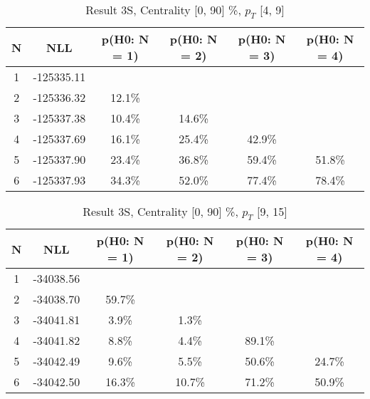 \begin{table}[htb]
	\begin{center}
	\caption{Result 3S, Centrality [0, 90] \%, $p_{T}$ [4, 9] \GeV
}
{\footnotesize\renewcommand{\arraystretch}{1.4}
		\begin{tabular}{cc||>{\columncolor[gray]{0.8}}cccc}
			N & NLL & p(H0: N = 1) & p(H0: N = 2) & p(H0: N = 3) & p(H0: N = 4)\\ 
		\hline
1 & -125335.11 & & & & \\
2 & -125336.32 & 12.1\% & & & \\
3 & -125337.38 & 10.4\% & 14.6\% & & \\
4 & -125337.69 & 16.1\% & 25.4\% & 42.9\% & \\
5 & -125337.90 & 23.4\% & 36.8\% & 59.4\% & 51.8\% \\
6 & -125337.93 & 34.3\% & 52.0\% & 77.4\% & 78.4\% \\
	\end{tabular}
		\label{tab:lab}
	}
	\end{center}\end{table}

\begin{table}[htb]
	\begin{center}
	\caption{Result 3S, Centrality [0, 90] \%, $p_{T}$ [9, 15] \GeV
}
{\footnotesize\renewcommand{\arraystretch}{1.4}
		\begin{tabular}{cc||cc>{\columncolor[gray]{0.8}}cc}
			N & NLL & p(H0: N = 1) & p(H0: N = 2) & p(H0: N = 3) & p(H0: N = 4)\\ 
		\hline
1 & -34038.56 & & & & \\
2 & -34038.70 & 59.7\% & & & \\
3 & -34041.81 & 3.9\% & 1.3\% & & \\
4 & -34041.82 & 8.8\% & 4.4\% & 89.1\% & \\
5 & -34042.49 & 9.6\% & 5.5\% & 50.6\% & 24.7\% \\
6 & -34042.50 & 16.3\% & 10.7\% & 71.2\% & 50.9\% \\
	\end{tabular}
		\label{tab:lab}
	}
	\end{center}\end{table}

